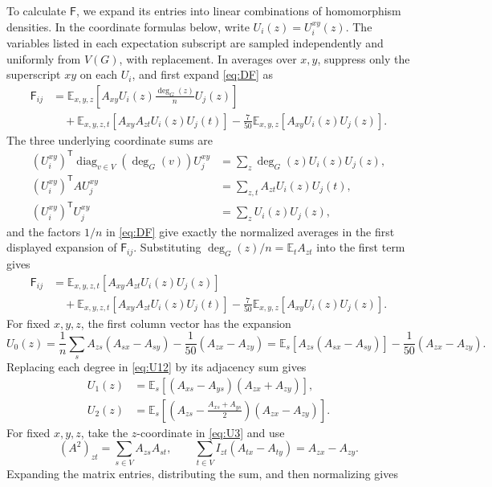 \documentclass[11pt]{article}
\newcommand{\E}{\mathbb E}
\begin{document}
To calculate $\mathsf F$, we expand its entries into linear combinations
of homomorphism densities.
In the coordinate formulas below, write $U_i(z)=U_i^{xy}(z)$.
The variables listed in each expectation subscript are sampled independently
and uniformly from $V(G)$, with replacement.
In averages over $x,y$, suppress only the superscript $xy$ on each $U_i$, and first expand \eqref{eq:DF} as
\begin{align*}
\mathsf F_{ij}
&=\E_{x,y,z}\left[A_{xy}U_i(z)\frac{\deg_G(z)}nU_j(z)\right]\\
&\quad+\E_{x,y,z,t}\left[A_{xy}A_{zt}U_i(z)U_j(t)\right]
-\frac7{50}\E_{x,y,z}\left[A_{xy}U_i(z)U_j(z)\right].
\end{align*}
The three underlying coordinate sums are
\begin{align*}
(U_i^{xy})^{\mathsf T}\operatorname{diag}_{v\in V}(\deg_G(v))U_j^{xy}
&=\sum_z\deg_G(z)U_i(z)U_j(z),\\
(U_i^{xy})^{\mathsf T}AU_j^{xy}
&=\sum_{z,t}A_{zt}U_i(z)U_j(t),\\
(U_i^{xy})^{\mathsf T}U_j^{xy}
&=\sum_zU_i(z)U_j(z),
\end{align*}
and the factors $1/n$ in \eqref{eq:DF} give exactly the normalized averages in the first displayed expansion of $\mathsf F_{ij}$.
Substituting $\deg_G(z)/n=\E_tA_{zt}$ into the first term gives
\begin{align*}
\mathsf F_{ij}
&=\E_{x,y,z,t}[A_{xy}A_{zt}U_i(z)U_j(z)]\\
&\quad+\E_{x,y,z,t}[A_{xy}A_{zt}U_i(z)U_j(t)]
-\frac7{50}\E_{x,y,z}[A_{xy}U_i(z)U_j(z)].
\end{align*}
For fixed $x,y,z$, the first column vector has the expansion
\[
U_0(z)=\frac1n\sum_sA_{zs}(A_{sx}-A_{sy})-\frac1{50}(A_{zx}-A_{zy})
=\E_s[A_{zs}(A_{sx}-A_{sy})]-\frac1{50}(A_{zx}-A_{zy}).
\]
Replacing each degree in \eqref{eq:U12} by its adjacency sum gives
\begin{align*}
U_1(z)&=\E_s[(A_{xs}-A_{ys})(A_{zx}+A_{zy})],\\
U_2(z)&=\E_s\left[
\left(A_{zs}-\frac{A_{xs}+A_{ys}}2\right)(A_{zx}-A_{zy})\right].
\end{align*}
For fixed $x,y,z$, take the $z$-coordinate in \eqref{eq:U3} and use
\[
(A^2)_{zt}=\sum_{s\in V}A_{zs}A_{st},
\qquad
\sum_{t\in V}I_{zt}(A_{tx}-A_{ty})=A_{zx}-A_{zy}.
\]
Expanding the matrix entries, distributing the sum, and then normalizing gives
\end{document}
